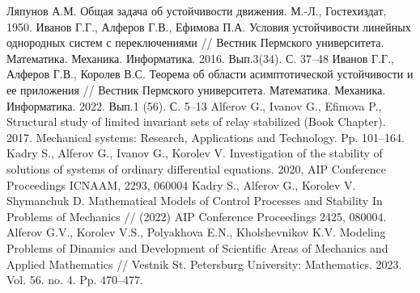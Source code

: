 \begin{thebibliography}{9} %
 Ляпунов А.М. Общая задача об устойчивости движения. М.-Л., Гостехиздат, 1950.
 Иванов Г.Г., Алферов Г.В., Ефимова П.А. Условия устойчивости линейных однородных систем с переключениями  //  Вестник Пермского университета. Математика. Механика. Информатика. 2016. Вып.3(34). С. 37--48
 Иванов Г.Г., Алферов Г.В., Королев В.С.  Теорема об области асимптотической устойчивости и ее приложения   // Вестник Пермского университета. Математика. Механика. Информатика. 2022. Вып.1 (56). С. 5--13
 Alferov G., Ivanov G., Efimova P., Structural study of limited invariant sets of relay stabilized (Book Chapter). 2017. Mechanical systems: Research, Applications and Technology. Pp. 101--164.
 Kadry S., Alferov G., Ivanov G., Korolev V. Investigation of the stability of solutions of systems of ordinary differential  equations.     2020, AIP Conference  Proceedings  ICNAAM,  2293, 060004
 Kadry S., Alferov G.,  Korolev V. Shymanchuk D. Mathematical  Models of Control  Processes and Stability In Problems of Mechanics // (2022) AIP Conference Proceedings 2425, 080004.
 Alferov G.V., Korolev V.S., Polyakhova E.N., Kholshevnikov K.V. Modeling Problems of Dinamics and Development of Scientific Areas of Mechanics and Applied Mathematics // Vestnik St. Petersburg University: Mathematics. 2023. Vol. 56. no. 4. Pp. 470--477.
\end{thebibliography}





% 
